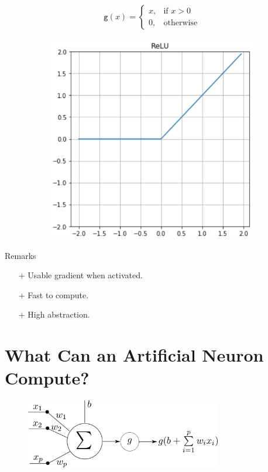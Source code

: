 \documentclass{book}
\newcommand{\act}{\texttt{g}}%
\begin{document}
\begin{figure}[h]
    \centering
    \begin{subfigure}{.5\textwidth}
        \[
        \act(x)=
        \begin{cases}
        x, & \text{if } x > 0\\
        0, & \text{otherwise}
        \end{cases}
        \]
    \end{subfigure}
    \begin{subfigure}{.5\textwidth}
        \includegraphics[width=.8\textwidth]{act_relu.png}
    \end{subfigure}
\end{figure}

\begin{block}{Remarks}
\begin{itemize}
\item[+] Usable gradient when activated.
\item[+] Fast to compute.
\item[+] High abstraction.
\end{itemize}
\end{block}

\section{What Can an Artificial Neuron Compute?}

\begin{figure}[h]
    \centering
    \includegraphics[height=3cm]{neurone}
\end{figure}
\end{document}
